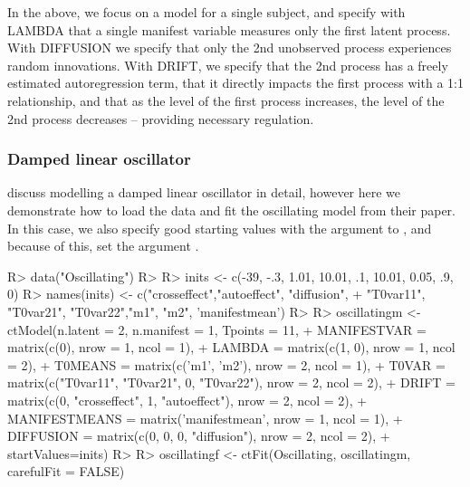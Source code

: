 \documentclass[nojss]{jss}\usepackage[]{graphicx}\usepackage[]{color}
\begin{document}
In the above, we focus on a model for a single subject, and specify with LAMBDA that a single manifest variable measures only the first latent process. With DIFFUSION we specify that only the 2nd unobserved process experiences random innovations. With DRIFT, we specify that the 2nd process has a freely estimated autoregression term, that it directly impacts the first process with a 1:1 relationship, and that as the level of the first process increases, the level of the 2nd process decreases -- providing necessary regulation. 
\subsubsection{Damped linear oscillator}\nopagebreak
\citet{voelkle2013continuous} discuss modelling a damped linear oscillator in detail, however here we demonstrate how to load the data and fit the oscillating model from their paper. In this case, we also specify good starting values with the  argument to , and because of this, set the argument .

\begin{Schunk}
\begin{Sinput}
R> data("Oscillating")
R> 
R> inits <- c(-39, -.3, 1.01, 10.01, .1, 10.01, 0.05, .9, 0)
R> names(inits) <- c("crosseffect","autoeffect", "diffusion",
+   "T0var11", "T0var21", "T0var22","m1", "m2", 'manifestmean')
R> 
R> oscillatingm <- ctModel(n.latent = 2, n.manifest = 1, Tpoints = 11,
+   MANIFESTVAR = matrix(c(0), nrow = 1, ncol = 1),
+   LAMBDA = matrix(c(1, 0), nrow = 1, ncol = 2),
+   T0MEANS = matrix(c('m1', 'm2'), nrow = 2, ncol = 1),
+   T0VAR = matrix(c("T0var11", "T0var21", 0, "T0var22"), nrow = 2, ncol = 2),
+   DRIFT = matrix(c(0, "crosseffect", 1, "autoeffect"), nrow = 2, ncol = 2),
+   MANIFESTMEANS = matrix('manifestmean', nrow = 1, ncol = 1),
+   DIFFUSION = matrix(c(0, 0, 0, "diffusion"), nrow = 2, ncol = 2),
+  startValues=inits)
R> 
R> oscillatingf <- ctFit(Oscillating, oscillatingm, carefulFit = FALSE)
\end{Sinput}
\end{Schunk}
\end{document}
